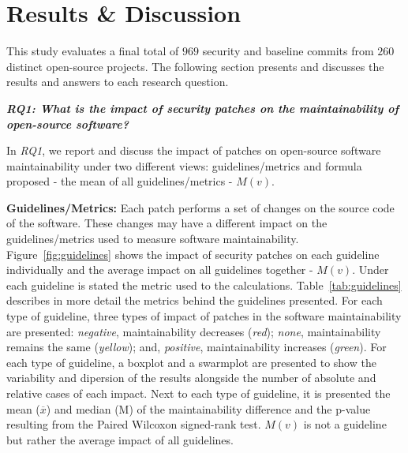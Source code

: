 \documentclass[10pt,conference]{IEEEtran}
\begin{document}
\section{Results \& Discussion}\label{sec:results}

This study evaluates a final total of $969$ security and baseline commits 
from $260$ distinct open-source projects. The following section presents and 
discusses the results and answers to each research question.

\textit{\textbf{RQ1: What is the impact of security patches on the
maintainability of open-source software?}}

In \emph{RQ1}, we report and discuss the impact of patches on open-source
software maintainability under two different views: guidelines/metrics 
and formula proposed - the mean of all 
guidelines/metrics - $M(v)$.

\textbf{Guidelines/Metrics:} Each patch performs a set of changes
on the source code of the software. These changes may have a different
impact on the guidelines/metrics used to measure software maintainability. 
Figure~\ref{fig:guidelines} shows the impact of security patches 
on each guideline individually and the average impact on all guidelines 
together - $M(v)$. Under each guideline is stated the 
metric used to the calculations. Table~\ref{tab:guidelines} describes 
in more detail the metrics behind the guidelines presented. 
For each type of guideline, three types of impact of patches in 
the software maintainability are presented: 
\emph{negative}, maintainability decreases (\emph{red});
\emph{none}, maintainability remains the same (\emph{yellow}); and,
\emph{positive}, maintainability increases (\emph{green}). 
For each type of guideline, a boxplot 
and a swarmplot are presented to show the variability and dipersion of
the results alongside the number of absolute
and relative cases of each impact. Next to each
type of guideline, it is presented the mean ($\overline{x}$) and median (M)
of the maintainability difference and the p-value resulting from the
Paired Wilcoxon signed-rank test. $M(v)$ is not a guideline but rather the 
average impact of all guidelines.
\end{document}
